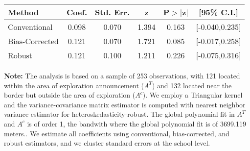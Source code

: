 \begin{table}[htbp]\centering
 \footnotesize 
\begin{tabular}{lccccc}
\hline\hline
Method & Coef. & Std. Err. & z & P$>|$z$|$ & [95\% C.I.] \\ 
\hline \hline  
Conventional & 0.098 & 0.070 & 1.394 & 0.163 & [-0.040,0.235] \\ 
 Bias-Corrected & 0.121 & 0.070 & 1.721 & 0.085 & [-0.017,0.258] \\ 
Robust & 0.121 & 0.100 & 1.211 & 0.226 & [-0.075,0.316] \\ 
  \hline\hline
\end{tabular}
\label{table:rd}
\begin{tablenotes} 
  \justifying \tiny \textbf{Note: }    
   The analysis is based on a sample of 253 observations, with 121 located within the area of exploration announcement ($A^{T}$) and 132 located near the border but outside the area of exploration  ($A^{c}$). 
           We employ a Triangular kernel and the variance-covariance matrix estimator is computed with nearest neighbor variance estimator for heteroskedasticity-robust. The global polynomial fit in  $A^{T}$ and $A^{c}$ is of order 1, the bandwith where the global polynomial fit is of 3699.119 meters.. We estimate all coefficients using conventional, bias-corrected, and robust estimators, and we cluster standard errors at the school level. \end{tablenotes} 
 \end{table} 
